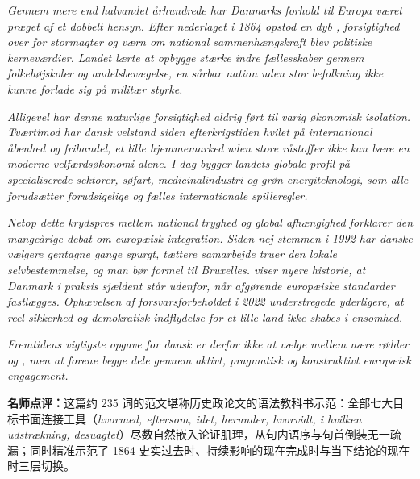 \begin{answerbox}
\textit{Gennem mere end halvandet århundrede har Danmarks forhold til Europa været præget af et dobbelt hensyn. Efter nederlaget i 1864 opstod en dyb ,  forsigtighed over for stormagter og værn om national sammenhængskraft blev politiske kerneværdier. Landet lærte at opbygge stærke indre fællesskaber gennem folkehøjskoler og andelsbevægelse,  en sårbar nation uden stor befolkning ikke kunne forlade sig på militær styrke.}

\textit{Alligevel har denne naturlige forsigtighed aldrig ført til varig økonomisk isolation. Tværtimod har dansk velstand siden efterkrigstiden hvilet på international åbenhed og frihandel,  et lille hjemmemarked uden store råstoffer ikke kan bære en moderne velfærdsøkonomi alene. I dag bygger landets globale profil på specialiserede sektorer,  søfart, medicinalindustri og grøn energiteknologi, som alle forudsætter forudsigelige og fælles internationale spilleregler.}

\textit{Netop dette krydspres mellem national tryghed og global afhængighed forklarer den mangeårige debat om europæisk integration. Siden nej-stemmen i 1992 har danske vælgere gentagne gange spurgt,  tættere samarbejde truer den lokale selvbestemmelse, og  man bør  formel  til Bruxelles.  viser nyere historie, at Danmark i praksis sjældent står udenfor, når afgørende europæiske standarder fastlægges. Ophævelsen af forsvarsforbeholdet i 2022 understregede yderligere, at reel sikkerhed og demokratisk indflydelse for et lille land ikke skabes i ensomhed.}

\textit{Fremtidens vigtigste opgave for dansk  er derfor ikke at vælge mellem nære rødder og , men at forene begge dele gennem aktivt, pragmatisk og konstruktivt europæisk engagement.}

\small\textbf{名师点评：}这篇约 235 词的范文堪称历史政论文的语法教科书示范：全部七大目标书面连接工具（\textit{hvormed, eftersom, idet, herunder, hvorvidt, i hvilken udstrækning, desuagtet}）尽数自然嵌入论证肌理，从句内语序与句首倒装无一疏漏；同时精准示范了 1864 史实过去时、持续影响的现在完成时与当下结论的现在时三层切换。
\end{answerbox}
